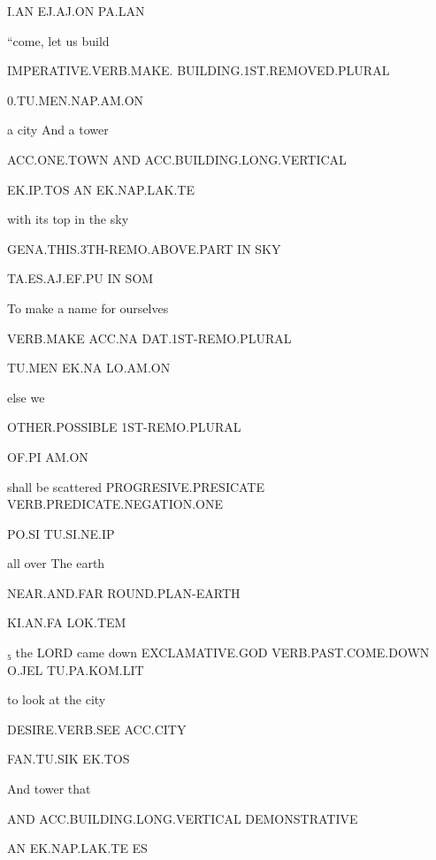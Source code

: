 {I.AN			EJ.AJ.ON			PA.LAN 

  

“come, let us build                                                                          

IMPERATIVE.VERB.MAKE. BUILDING.1ST.REMOVED.PLURAL	 

0.TU.MEN.NAP.AM.ON                                                                              

 

a city			And 	a tower	 

ACC.ONE.TOWN		AND	ACC.BUILDING.LONG.VERTICAL 

EK.IP.TOS		AN	EK.NAP.LAK.TE	 

 

with its top 				in           the sky 

GENA.THIS.3TH-REMO.ABOVE.PART	IN	SKY 

TA.ES.AJ.EF.PU				IN	SOM 

  

To make 	a name 		for ourselves		 

VERB.MAKE	ACC.NA		DAT.1ST-REMO.PLURAL	 

TU.MEN	EK.NA		LO.AM.ON 

 

else 			we 

OTHER.POSSIBLE	1ST-REMO.PLURAL 

OF.PI			AM.ON 

 

shall be			    scattered			PROGRESIVE.PRESICATE    VERB.PREDICATE.NEGATION.ONE        

PO.SI			     TU.SI.NE.IP		 

 

all over			The earth 

NEAR.AND.FAR		ROUND.PLAN-EARTH 

KI.AN.FA		LOK.TEM 

 

₅ the LORD 		came down 			EXCLAMATIVE.GOD         VERB.PAST.COME.DOWN		O.JEL			TU.PA.KOM.LIT			 

 

to look			at the city 

DESIRE.VERB.SEE	ACC.CITY 

FAN.TU.SIK		EK.TOS 

  

And 	tower 				that 			 

AND	ACC.BUILDING.LONG.VERTICAL	DEMONSTRATIVE	 

AN	EK.NAP.LAK.TE			ES			 

}

